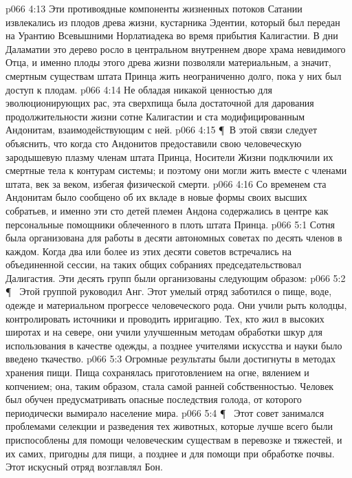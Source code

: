 \vs p066 4:13 Эти противоядные компоненты жизненных потоков Сатании извлекались из плодов древа жизни, кустарника Эдентии, который был передан на Урантию Всевышними Норлатиадека во время прибытия Калигастии. В дни Даламатии это дерево росло в центральном внутреннем дворе храма невидимого Отца, и именно плоды этого древа жизни позволяли материальным, а значит, смертным существам штата Принца жить неограниченно долго, пока у них был доступ к плодам.
\vs p066 4:14 Не обладая никакой ценностью для эволюционирующих рас, эта сверхпища была достаточной для дарования продолжительности жизни сотне Калигастии и ста модифицированным Андонитам, взаимодействующим с ней.
\vs p066 4:15 \P\ В этой связи следует объяснить, что когда сто Андонитов предоставили свою человеческую зародышевую плазму членам штата Принца, Носители Жизни подключили их смертные тела к контурам системы; и поэтому они могли жить вместе с членами штата, век за веком, избегая физической смерти.
\vs p066 4:16 Со временем ста Андонитам было сообщено об их вкладе в новые формы своих высших собратьев, и именно эти сто детей племен Андона содержались в центре как персональные помощники облеченного в плоть штата Принца.
\vs p066 5:1 Сотня была организована для работы в десяти автономных советах по десять членов в каждом. Когда два или более из этих десяти советов встречались на объединенной сессии, на таких общих собраниях председательствовал Далигастия. Эти десять групп были организованы следующим образом:
\vs p066 5:2 \P\ \bibnobreakspace {} Этой группой руководил Анг. Этот умелый отряд заботился о пище, воде, одежде и материальном прогрессе человеческого рода. Они учили рыть колодцы, контролировать источники и проводить ирригацию. Тех, кто жил в высоких широтах и на севере, они учили улучшенным методам обработки шкур для использования в качестве одежды, а позднее учителями искусства и науки было введено ткачество.
\vs p066 5:3 Огромные результаты были достигнуты в методах хранения пищи. Пища сохранялась приготовлением на огне, вялением и копчением; она, таким образом, стала самой ранней собственностью. Человек был обучен предусматривать опасные последствия голода, от которого периодически вымирало население мира.
\vs p066 5:4 \P\ \bibnobreakspace {} Этот совет занимался проблемами селекции и разведения тех животных, которые лучше всего были приспособлены для помощи человеческим существам в перевозке и тяжестей, и их самих, пригодны для пищи, а позднее и для помощи при обработке почвы. Этот искусный отряд возглавлял Бон.
